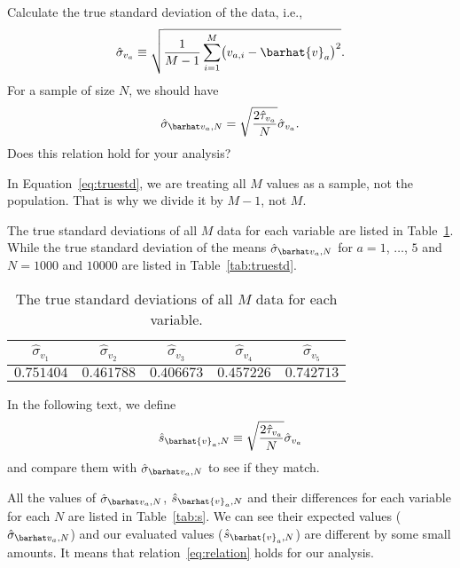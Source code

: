 \Question{} Calculate the true standard deviation of the data, i.e.,
%
\begin{equation}\label{eq:truestd}
    \hat{\sigma}_{v_a} \equiv \sqrt{\frac{ 1 }{ M - 1 }
        \sum_{i=1}^M \bigl( v_{a,i} - \barhat{v}_a \bigr)^2}.
\end{equation}
%
For a sample of size \(N\), we should have
%
\begin{equation}\label{eq:relation}
    \sgbar{a} = \sqrt{\frac{ 2 \hat{\tau}_{v_a} }{ N }} \hat{\sigma}_{v_a}.
\end{equation}
%
Does this relation hold for your analysis?

\Answer{}
In Equation~\eqref{eq:truestd}, we are treating all \(M\) values as a sample,
not the population.
That is why we divide it by \(M - 1\), not \(M\).

The true standard deviations of all \(M\) data for each variable are
listed in Table~\ref{tab:std}.
While the true standard deviation of the means
\(\sgbar{a}\) for \(a = 1\), \(\ldots\), \(5\) and \(N = 1000\) and \(10000\) are
listed in Table~\ref{tab:truestd}.

\begin{table}[H]
    \centering
    \caption{The true standard deviations of all \(M\) data for each variable.}
    \label{tab:std}
    \begin{tabular}{@{}ccccc@{}}
        \toprule
        \(\hat{\sigma}_{v_1}\) & \(\hat{\sigma}_{v_2}\) & \(\hat{\sigma}_{v_3}\) & \(\hat{\sigma}_{v_4}\) & \(\hat{\sigma}_{v_5}\) \\
        \midrule
        \(0.751404\)           & \(0.461788\)           & \(0.406673\)           & \(0.457226\)           & \(0.742713\)           \\
        \bottomrule
    \end{tabular}
\end{table}

In the following text, we define
%
\begin{equation}
    \hat{s}_{\barhat{v}_a,N} \equiv \sqrt{\frac{ 2 \hat{\tau}_{v_a} }{ N }} \hat{\sigma}_{v_a}
\end{equation}
%
and compare them with \(\sgbar{a}\) to see if they match.

All the values of \(\sgbar{a}\), \(\hat{s}_{\barhat{v}_a,N}\) and their differences
for each variable for each \(N\) are listed in Table~\ref{tab:s}.
We can see their expected values (\(\sgbar{a}\)) and our evaluated values
(\(\hat{s}_{\barhat{v}_a,N}\)) are different by some small amounts.
It means that relation~\eqref{eq:relation} holds for our analysis.


